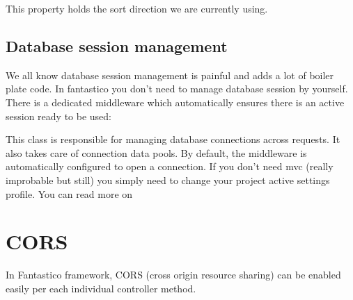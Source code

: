 \documentclass[letterpaper,10pt,english]{sphinxmanual}
\begin{document}
\begin{fulllineitems}
\begin{fulllineitems}
\end{fulllineitems}


\begin{fulllineitems}
\label{features/mvc:fantastico.mvc.models.model_sort.ModelSort.sort_dir}
This property holds the sort direction we are currently using.

\end{fulllineitems}


\end{fulllineitems}



\subsection{Database session management}
\label{features/mvc:database-session-management}
We all know database session management is painful and adds a lot of boiler plate code. In fantastico you don't need
to manage database session by yourself. There is a dedicated middleware which automatically ensures there is an
active session ready to be used:

\begin{fulllineitems}
\label{features/mvc:fantastico.middleware.model_session_middleware.ModelSessionMiddleware}
This class is responsible for managing database connections across requests. It also takes care of
connection data pools. By default, the middleware is automatically configured to open a connection. If
you don't need mvc (really improbable but still) you simply need to change your project active settings
profile. You can read more on {\hyperref[get_started/settings:fantastico.settings.BasicSettings]{}}

\end{fulllineitems}



\section{CORS}
\label{features/cors::doc}\label{features/cors:cors}
In Fantastico framework, CORS (cross origin resource sharing) can be enabled easily per each individual controller method.
\end{document}
